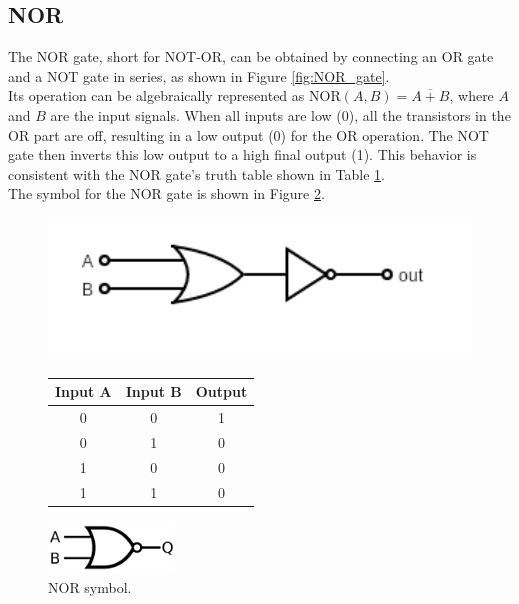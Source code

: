 \subsection{NOR}
    The NOR gate, short for NOT-OR, can be obtained by connecting an OR gate and a NOT gate in series, as shown in Figure \ref{fig:NOR_gate}. \\
    Its operation can be algebraically represented as $\text{NOR}(A, B) = \overline{A + B}$, where $A$ and $B$ are the input signals.
    When all inputs are low (0), all the transistors in the OR part are off, resulting in a low output (0) for the OR operation. 
    The NOT gate then inverts this low output to a high final output (1).
    This behavior is consistent with the NOR gate's truth table shown in Table \ref{tab:NOR_table}. \\
    The symbol for the NOR gate is shown in Figure \ref{fig:NOR_sym}.

    \begin{figure}[H]   
        \begin{minipage}{0.5\textwidth}
            \centering
            \includegraphics[width=1.1\textwidth]{figures/circuits/NOR.png}
            \label{fig:NOR_gate} 
        \end{minipage}
        \begin{minipage}{0.5\textwidth}
            \centering
            \begin{tabular}{|c|c|c|}
                \hline
                Input A & Input B & Output \\
                \hline
                0 & 0 & 1 \\
                0 & 1 & 0 \\
                1 & 0 & 0 \\
                1 & 1 & 0 \\
                \hline
            \end{tabular}
            \label{tab:NOR_table}
        \end{minipage}
	\end{figure}

	\begin{figure}[H]
	    \centering
	    \includegraphics[width=0.3\textwidth]{figures/symbols/NOR.png}
	    \caption{NOR symbol.}
	    \label{fig:NOR_sym} 
	\end{figure}
